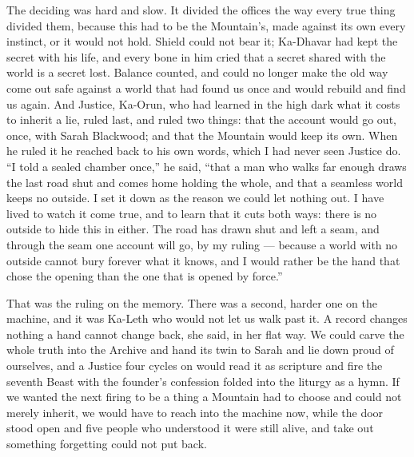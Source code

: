 The deciding was hard and slow. It divided the offices the way every true thing divided them, because this had to be the Mountain's, made against its own every instinct, or it would not hold. Shield could not bear it; Ka-Dhavar had kept the secret with his life, and every bone in him cried that a secret shared with the world is a secret lost. Balance counted, and could no longer make the old way come out safe against a world that had found us once and would rebuild and find us again. And Justice, Ka-Orun, who had learned in the high dark what it costs to inherit a lie, ruled last, and ruled two things: that the account would go out, once, with Sarah Blackwood; and that the Mountain would keep its own. When he ruled it he reached back to his own words, which I had never seen Justice do. ``I told a sealed chamber once,'' he said, ``that a man who walks far enough draws the last road shut and comes home holding the whole, and that a seamless world keeps no outside. I set it down as the reason we could let nothing out. I have lived to watch it come true, and to learn that it cuts both ways: there is no outside to hide this in either. The road has drawn shut and left a seam, and through the seam one account will go, by my ruling --- because a world with no outside cannot bury forever what it knows, and I would rather be the hand that chose the opening than the one that is opened by force.''\par

\ornament

That was the ruling on the memory. There was a second, harder one on the machine, and it was Ka-Leth who would not let us walk past it. A record changes nothing a hand cannot change back, she said, in her flat way. We could carve the whole truth into the Archive and hand its twin to Sarah and lie down proud of ourselves, and a Justice four cycles on would read it as scripture and fire the seventh Beast with the founder's confession folded into the liturgy as a hymn. If we wanted the next firing to be a thing a Mountain had to choose and could not merely inherit, we would have to reach into the machine now, while the door stood open and five people who understood it were still alive, and take out something forgetting could not put back.\par

